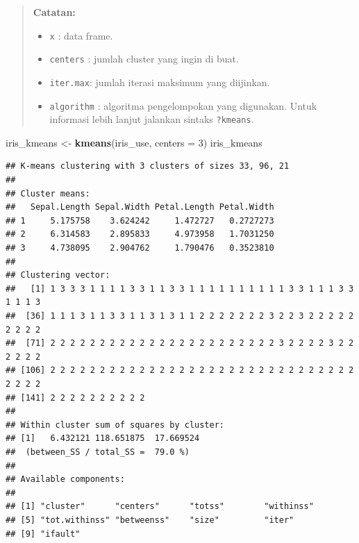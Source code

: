 \documentclass[]{book}
\newenvironment{Shaded}{\begin{snugshade}}{\end{snugshade}}
\newcommand{\CommentTok}[1]{\textcolor[rgb]{0.56,0.35,0.01}{\textit{#1}}}
\newcommand{\ControlFlowTok}[1]{\textcolor[rgb]{0.13,0.29,0.53}{\textbf{#1}}}
\newcommand{\DataTypeTok}[1]{\textcolor[rgb]{0.13,0.29,0.53}{#1}}
\newcommand{\DecValTok}[1]{\textcolor[rgb]{0.00,0.00,0.81}{#1}}
\newcommand{\KeywordTok}[1]{\textcolor[rgb]{0.13,0.29,0.53}{\textbf{#1}}}
\newcommand{\NormalTok}[1]{#1}
\newcommand{\OperatorTok}[1]{\textcolor[rgb]{0.81,0.36,0.00}{\textbf{#1}}}
\newcommand{\StringTok}[1]{\textcolor[rgb]{0.31,0.60,0.02}{#1}}
\providecommand{\tightlist}{%
  \setlength{\itemsep}{0pt}\setlength{\parskip}{0pt}}
\theoremstyle{definition}
\theoremstyle{definition}
\theoremstyle{definition}
\theoremstyle{remark}
\begin{document}
\begin{quote}
\textbf{Catatan:}

\begin{itemize}
\tightlist
\item
  \texttt{x} : data frame.
\item
  \texttt{centers} : jumlah cluster yang ingin di buat.
\item
  \texttt{iter.max}: jumlah iterasi maksimum yang diijinkan.
\item
  \texttt{algorithm} : algoritma pengelompokan yang digunakan. Untuk informasi lebih lanjut jalankan sintaks \texttt{?kmeans}.
\end{itemize}
\end{quote}

\begin{Shaded}
\begin{Highlighting}[]
\NormalTok{iris_kmeans <-}\StringTok{ }\KeywordTok{kmeans}\NormalTok{(iris_use, }\DataTypeTok{centers =} \DecValTok{3}\NormalTok{)}
\NormalTok{iris_kmeans}
\end{Highlighting}
\end{Shaded}

\begin{verbatim}
## K-means clustering with 3 clusters of sizes 33, 96, 21
## 
## Cluster means:
##   Sepal.Length Sepal.Width Petal.Length Petal.Width
## 1     5.175758    3.624242     1.472727   0.2727273
## 2     6.314583    2.895833     4.973958   1.7031250
## 3     4.738095    2.904762     1.790476   0.3523810
## 
## Clustering vector:
##   [1] 1 3 3 3 1 1 1 1 3 3 1 1 3 3 1 1 1 1 1 1 1 1 1 1 3 3 1 1 1 3 3 1 1 1 3
##  [36] 1 1 1 3 1 1 3 3 1 1 3 1 3 1 1 2 2 2 2 2 2 2 3 2 2 3 2 2 2 2 2 2 2 2 2
##  [71] 2 2 2 2 2 2 2 2 2 2 2 2 2 2 2 2 2 2 2 2 2 2 2 3 2 2 2 2 3 2 2 2 2 2 2
## [106] 2 2 2 2 2 2 2 2 2 2 2 2 2 2 2 2 2 2 2 2 2 2 2 2 2 2 2 2 2 2 2 2 2 2 2
## [141] 2 2 2 2 2 2 2 2 2 2
## 
## Within cluster sum of squares by cluster:
## [1]   6.432121 118.651875  17.669524
##  (between_SS / total_SS =  79.0 %)
## 
## Available components:
## 
## [1] "cluster"      "centers"      "totss"        "withinss"    
## [5] "tot.withinss" "betweenss"    "size"         "iter"        
## [9] "ifault"
\end{verbatim}

\begin{Shaded}
\end{Shaded}
\end{document}
